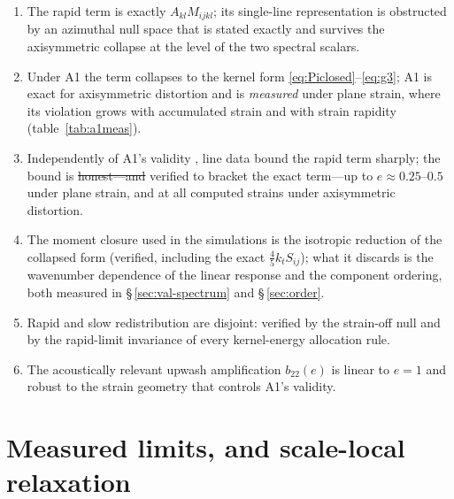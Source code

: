 \documentclass[lineno]{JFM-FLM_Au}
\providecommand{\DIFadd}[1]{{\protect\color{blue}\uwave{#1}}} %
\providecommand{\DIFdel}[1]{{\protect\color{red}\sout{#1}}} %
\providecommand{\DIFaddbegin}{} %
\providecommand{\DIFaddend}{} %
\providecommand{\DIFdelbegin}{} %
\providecommand{\DIFdelend}{} %
\begin{document}
\begin{enumerate}
\item The rapid term is exactly $A_{kl}M_{ijkl}$; its single-line
  representation is obstructed by an azimuthal null space that is stated
  exactly and survives the axisymmetric collapse at the level of the two
  spectral scalars.
\item Under A1 the term collapses to the kernel form
  \eqref{eq:Piclosed}--\eqref{eq:g3}; A1 is exact for axisymmetric
  distortion and is \emph{measured} under plane strain, where its violation
  grows with accumulated strain and with strain rapidity
  (table~\ref{tab:a1meas}).
\item Independently of A1's validity \DIFaddbegin \DIFadd{DNS}\DIFaddend , line data bound the rapid term
  sharply; the bound is \DIFdelbegin \DIFdel{honest---and }\DIFdelend \DIFaddbegin \DIFadd{valid---and }\DIFaddend verified to bracket the exact
  term---up to $e\approx0.25$--$0.5$ under plane strain, and at all
  computed strains under axisymmetric distortion.
\item The moment closure used in the simulations is the isotropic reduction
  of the collapsed form (verified, including the exact
  $\tfrac45k_tS_{ij}$); what it discards is the wavenumber dependence of
  the linear response and the component ordering, both measured in
  \S\,\ref{sec:val-spectrum} and \S\,\ref{sec:order}.
\item Rapid and slow redistribution are disjoint: verified by the
  strain-off null and by the rapid-limit invariance of every \DIFaddbegin \DIFadd{tested }\DIFaddend kernel-energy
  allocation rule.
\item The acoustically relevant upwash amplification $b_{22}(e)$ is linear
  to $e=1$ and robust to the strain geometry that controls A1's validity.
\end{enumerate}


\section{Measured limits, and scale-local relaxation}\label{sec:limits}
\end{document}
